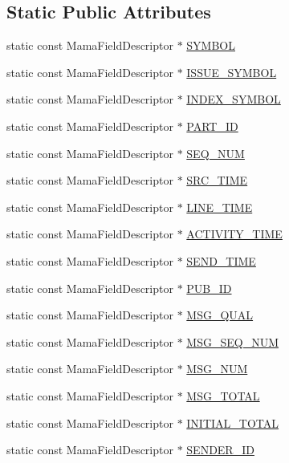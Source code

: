 \subsection*{Static Public Attributes}
\begin{CompactItemize}
\item 
static const Mama\-Field\-Descriptor $\ast$ \hyperlink{classWombat_1_1MamdaCommonFields_52242fa6e097ae76f1f556d7843bdad3}{SYMBOL}
\item 
static const Mama\-Field\-Descriptor $\ast$ \hyperlink{classWombat_1_1MamdaCommonFields_99f721fdf7139674177962f0a919ba21}{ISSUE\_\-SYMBOL}
\item 
static const Mama\-Field\-Descriptor $\ast$ \hyperlink{classWombat_1_1MamdaCommonFields_215204714b6b897dcca757cdc4e15767}{INDEX\_\-SYMBOL}
\item 
static const Mama\-Field\-Descriptor $\ast$ \hyperlink{classWombat_1_1MamdaCommonFields_62b732a8b6e29124a740a2eed0a97b47}{PART\_\-ID}
\item 
static const Mama\-Field\-Descriptor $\ast$ \hyperlink{classWombat_1_1MamdaCommonFields_8ef11e5f4f3c0e6d25ca80800c81973f}{SEQ\_\-NUM}
\item 
static const Mama\-Field\-Descriptor $\ast$ \hyperlink{classWombat_1_1MamdaCommonFields_edb1d313b74d724a2b1abf7822feb8a1}{SRC\_\-TIME}
\item 
static const Mama\-Field\-Descriptor $\ast$ \hyperlink{classWombat_1_1MamdaCommonFields_a453bce768eb6d398a6f7bdbd10ce16c}{LINE\_\-TIME}
\item 
static const Mama\-Field\-Descriptor $\ast$ \hyperlink{classWombat_1_1MamdaCommonFields_a0cad06dd9315e3308902b4cd6e4e174}{ACTIVITY\_\-TIME}
\item 
static const Mama\-Field\-Descriptor $\ast$ \hyperlink{classWombat_1_1MamdaCommonFields_8edaa0c3f14b6f0092ed180cf641344f}{SEND\_\-TIME}
\item 
static const Mama\-Field\-Descriptor $\ast$ \hyperlink{classWombat_1_1MamdaCommonFields_44b16ef3eb7299cdc174de13a6ba6ae3}{PUB\_\-ID}
\item 
static const Mama\-Field\-Descriptor $\ast$ \hyperlink{classWombat_1_1MamdaCommonFields_c4d1de3aac0a8efe2e3982bc84d450cf}{MSG\_\-QUAL}
\item 
static const Mama\-Field\-Descriptor $\ast$ \hyperlink{classWombat_1_1MamdaCommonFields_e28c1b20b388b2dfa47f944df385c28f}{MSG\_\-SEQ\_\-NUM}
\item 
static const Mama\-Field\-Descriptor $\ast$ \hyperlink{classWombat_1_1MamdaCommonFields_3ebbb5b61e5f5e8e00c4838fa5f18727}{MSG\_\-NUM}
\item 
static const Mama\-Field\-Descriptor $\ast$ \hyperlink{classWombat_1_1MamdaCommonFields_4f870e21bf85ab68cab6dacfa4209c51}{MSG\_\-TOTAL}
\item 
static const Mama\-Field\-Descriptor $\ast$ \hyperlink{classWombat_1_1MamdaCommonFields_dd2a457d309aff0b7bccb8544da7d73b}{INITIAL\_\-TOTAL}
\item 
static const Mama\-Field\-Descriptor $\ast$ \hyperlink{classWombat_1_1MamdaCommonFields_589926d1b7c4a75b8e2f20b761c27ea9}{SENDER\_\-ID}
\end{CompactItemize}


